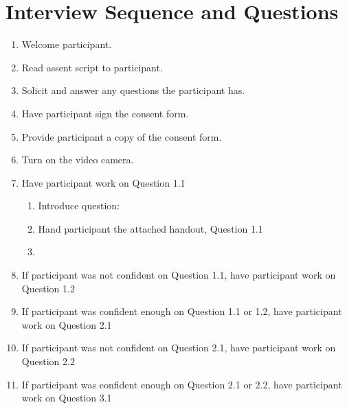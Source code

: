 \documentclass{article}
\begin{document}
\section{Interview Sequence and Questions}
\begin{enumerate}
  \item Welcome participant.
  \item Read assent script to participant.
  \item Solicit and answer any questions the participant has.
  \item Have participant sign the consent form.
  \item Provide participant a copy of the consent form.
  \item Turn on the video camera.
  \item Have participant work on Question 1.1 \\
  \begin{enumerate}
    \item Introduce question:
    \item Hand participant the attached handout, Question 1.1
    \item 
  \end{enumerate}
  \item If participant was not confident on Question 1.1, have participant work on Question 1.2
  \item If participant was confident enough on Question 1.1 or 1.2, have participant work on Question 2.1
  \item If participant was not confident on Question 2.1, have participant work on Question 2.2
  \item If participant was confident enough on Question 2.1 or 2.2, have participant work on Question 3.1
  
\end{enumerate}
\end{document}
